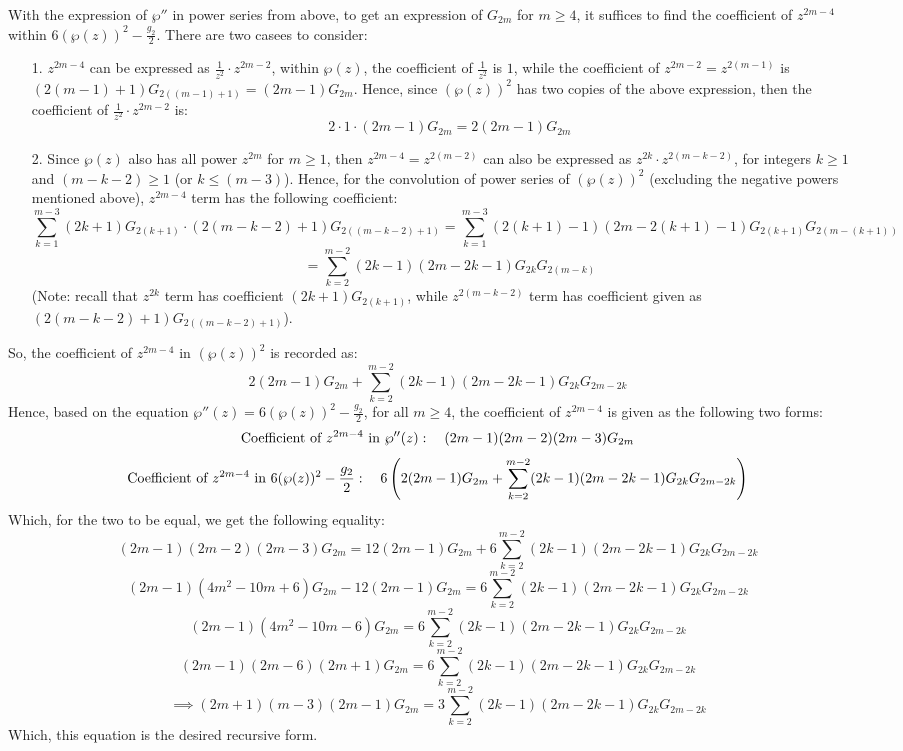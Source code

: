 \documentclass{article}
\begin{document}
With the expression of $\wp''$ in power series from above, to get an expression of $G_{2m}$ for $m\geq 4$, it suffices to find the coefficient of $z^{2m-4}$ within $6(\wp(z))^2-\frac{g_2}{2}$.
There are two casees to consider:
\begin{itemize}
    \item[1.] $z^{2m-4}$ can be expressed as $\frac{1}{z^2}\cdot z^{2m-2}$, within $\wp(z)$, the coefficient of $\frac{1}{z^2}$ is $1$, while the coefficient of $z^{2m-2}=z^{2(m-1)}$ is $(2(m-1)+1)G_{2((m-1)+1)} = (2m-1)G_{2m}$.
    Hence, since $(\wp(z))^2$ has two copies of the above expression, then the coefficient of $\frac{1}{z^2}\cdot z^{2m-2}$ is:
    $$2\cdot 1\cdot (2m-1)G_{2m} = 2(2m-1)G_{2m}$$
    \item[2.] Since $\wp(z)$ also has all power $z^{2m}$ for $m\geq 1$, then $z^{2m-4}=z^{2(m-2)}$ can also be expressed as $z^{2k}\cdot z^{2(m-k-2)}$, for integers $k\geq 1$ and $(m-k-2)\geq 1 $
    (or $k\leq (m-3)$). Hence, for the convolution of power series of $(\wp(z))^2$ (excluding the negative powers mentioned above), $z^{2m-4}$ term has the following coefficient:
    $$\sum_{k=1}^{m-3}(2k+1)G_{2(k+1)}\cdot (2(m-k-2)+1)G_{2((m-k-2)+1)} = \sum_{k=1}^{m-3}(2(k+1)-1)(2m-2(k+1)-1)G_{2(k+1)}G_{2(m-(k+1))}$$
    $$ = \sum_{k=2}^{m-2}(2k-1)(2m-2k-1)G_{2k}G_{2(m-k)}$$
    (Note: recall that $z^{2k}$ term has coefficient $(2k+1)G_{2(k+1)}$, while $z^{2(m-k-2)}$ term has coefficient given as $(2(m-k-2)+1)G_{2((m-k-2)+1)}$).
\end{itemize}
So, the coefficient of $z^{2m-4}$ in $(\wp(z))^2$ is recorded as:
$$2(2m-1)G_{2m}+\sum_{k=2}^{m-2}(2k-1)(2m-2k-1)G_{2k}G_{2m-2k}$$
Hence, based on the equation $\wp''(z)=6(\wp(z))^2-\frac{g_2}{2}$, for all $m\geq 4$, the coefficient of $z^{2m-4}$ is given as the following two forms:
$$\textmd{Coefficient of } z^{2m-4} \textmd{ in } \wp''(z):\quad (2m-1)(2m-2)(2m-3)G_{2m}$$
$$\textmd{Coefficient of } z^{2m-4} \textmd{ in } 6(\wp(z))^2-\frac{g_2}{2}:\quad 6\left(2(2m-1)G_{2m}+\sum_{k=2}^{m-2}(2k-1)(2m-2k-1)G_{2k}G_{2m-2k}\right)$$
Which, for the two to be equal, we get the following equality:
$$(2m-1)(2m-2)(2m-3)G_{2m}=12(2m-1)G_{2m}+6\sum_{k=2}^{m-2}(2k-1)(2m-2k-1)G_{2k}G_{2m-2k}$$
$$(2m-1)(4m^2-10m+6)G_{2m}-12(2m-1)G_{2m}=6\sum_{k=2}^{m-2}(2k-1)(2m-2k-1)G_{2k}G_{2m-2k}$$
$$(2m-1)(4m^2-10m-6)G_{2m}=6\sum_{k=2}^{m-2}(2k-1)(2m-2k-1)G_{2k}G_{2m-2k}$$
$$(2m-1)(2m-6)(2m+1)G_{2m}=6\sum_{k=2}^{m-2}(2k-1)(2m-2k-1)G_{2k}G_{2m-2k}$$
$$\implies (2m+1)(m-3)(2m-1)G_{2m}=3\sum_{k=2}^{m-2}(2k-1)(2m-2k-1)G_{2k}G_{2m-2k}$$
Which, this equation is the desired recursive form.
\end{document}
